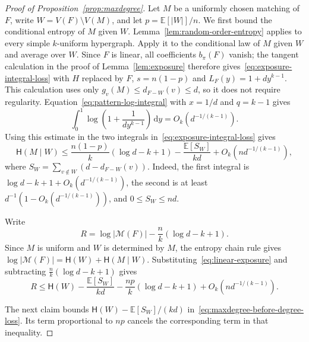 \documentclass[11pt,reqno]{amsart}
\numberwithin{equation}{section}
\theoremstyle{plain}
\theoremstyle{definition}
\newcommand{\calM}{\mathcal{M}}
\newcommand{\E}{\mathbb E}
\newcommand{\HH}{\mathsf H}
\newcommand{\dd}{\,\mathrm d}
\begin{document}
\begin{proof}[Proof of Proposition~\ref{prop:maxdegree}]
    Let $M$ be a uniformly chosen matching of $F$, write $W=V(F)\setminus V(M)$, and let $p=\E[|W|]/n$.
    We first bound the conditional entropy of $M$ given $W$.
    Lemma~\ref{lem:random-order-entropy} applies to every simple $k$-uniform hypergraph.
    Apply it to the conditional law of $M$ given $W$ and average over $W$.
    Since $F$ is linear, all coefficients $b_\pi(F)$ vanish; the tangent calculation in the proof of Lemma~\ref{lem:exposure} therefore gives~\eqref{eq:exposure-integral-loss} with $H$ replaced by $F$, $s=n(1-p)$ and $L_F(y)=1+dy^{k-1}$.
    This calculation uses only $g_v(M)\le d_{F-W}(v)\le d$, so it does not require regularity.
    Equation~\eqref{eq:pattern-log-integral} with $x=1/d$ and $q=k-1$ gives
    \[
        \int_0^1\log\left(1+\frac1{dy^{k-1}}\right)\dd y=O_k(d^{-1/(k-1)}).
    \]
    Using this estimate in the two integrals in~\eqref{eq:exposure-integral-loss} gives
    \begin{equation}\label{eq:linear-exposure}
        \HH(M\mid W)\le\frac{n(1-p)}k(\log d-k+1)
        -\frac{\E[S_W]}{kd}+O_k(nd^{-1/(k-1)}),
    \end{equation}
    where $S_W=\sum_{v\notin W}(d-d_{F-W}(v))$.
    Indeed, the first integral is $\log d-k+1+O_k(d^{-1/(k-1)})$, the second is at least $d^{-1}(1-O_k(d^{-1/(k-1)}))$, and $0\le S_W\le nd$.

    Write
    \[
        R=\log|\calM(F)|-\frac nk(\log d-k+1).
    \]
    Since $M$ is uniform and $W$ is determined by $M$, the entropy chain rule gives $\log|\calM(F)|=\HH(W)+\HH(M\mid W)$.
    Substituting~\eqref{eq:linear-exposure} and subtracting $\frac nk(\log d-k+1)$ gives
    \begin{equation}\label{eq:maxdegree-before-degree-loss}
        R\le\HH(W)-\frac{\E[S_W]}{kd}
        -\frac{np}{k}(\log d-k+1)+O_k(nd^{-1/(k-1)}).
    \end{equation}

    The next claim bounds $\HH(W)-\E[S_W]/(kd)$ in~\eqref{eq:maxdegree-before-degree-loss}.
    Its term proportional to $np$ cancels the corresponding term in that inequality.


\end{proof}
\end{document}
